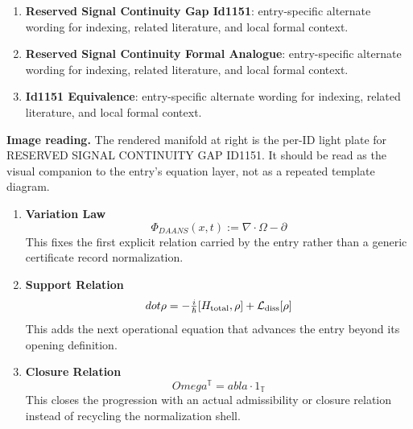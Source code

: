 \begin{enumerate}[leftmargin=1.6em,itemsep=6pt,topsep=4pt]
\item \textbf{Reserved Signal Continuity Gap Id1151}: entry-specific alternate wording for indexing, related literature, and local formal context.
\item \textbf{Reserved Signal Continuity Formal Analogue}: entry-specific alternate wording for indexing, related literature, and local formal context.
\item \textbf{Id1151 Equivalence}: entry-specific alternate wording for indexing, related literature, and local formal context.
\end{enumerate}

\begin{samepage}
\noindent\begin{minipage}[t]{0.45\linewidth}
\vspace{0pt}
\raggedright
\scriptsize\textbf{Image reading.} The rendered manifold at right is the per-ID light plate for RESERVED SIGNAL CONTINUITY GAP ID1151. It should be read as the visual companion to the entry's equation layer, not as a repeated template diagram.\par
\end{minipage}\hfill
\begin{minipage}[t]{0.53\linewidth}
\vspace*{-0.10in}
\raggedright
{}
\end{minipage}
\end{samepage}

\clearpage


\begin{enumerate}[leftmargin=1.6em,itemsep=9pt,topsep=6pt]
\item \textbf{Variation Law}
\[
\Phi_{DAANS}(x,t):=\nabla\cdot\Omega-\partial
\]
This fixes the first explicit relation carried by the entry rather than a generic certificate record normalization.

\item \textbf{Support Relation}
\[
dot\rho = -\tfrac{i}{\hbar}[H_{\rm total},\rho]+\mathcal L_{\rm diss}[\rho]
\]
This adds the next operational equation that advances the entry beyond its opening definition.

\item \textbf{Closure Relation}
\[
Omega^{\mathbb{T}}= abla\cdot1_{\mathbb{T}}
\]
This closes the progression with an actual admissibility or closure relation instead of recycling the normalization shell.
\end{enumerate}

